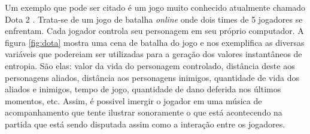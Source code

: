 Um exemplo que pode ser citado é um jogo muito conhecido atualmente chamado Dota 2 \cite{dota}. Trata-se de um jogo de batalha \textit{online} onde dois times de 5 jogadores se enfrentam. Cada jogador controla seu personagem em seu próprio computador. A figura \ref{fig:dota} mostra uma cena de batalha do jogo e nos exemplifica as diversas variáveis que podereiam ser utilizadas para a geração dos valores instantâneos de entropia. São elas: valor da vida do personagem controlado, distância deste aos personagens aliados, distância aos personagens inimigos, quantidade de vida dos aliados e inimigos, tempo de jogo, quantidade de dano deferida nos últimos momentos, etc. Assim, é possivel imergir o jogador em uma música de acompanhamento que tente ilustrar sonoramente o que está acontecendo na partida que está sendo disputada assim como a interação entre os jogadores.
